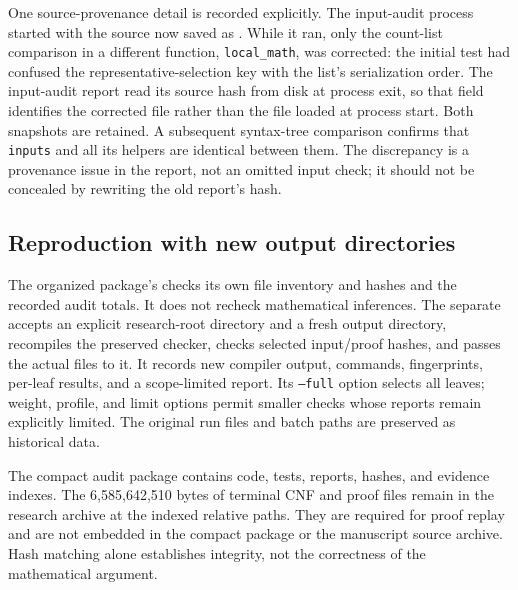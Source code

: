 One source-provenance detail is recorded explicitly. The input-audit
process started with the source now saved as .
While it ran, only the count-list comparison in a different function,
\texttt{local\_math}, was corrected: the initial test had confused the
representative-selection key with the list's serialization order.
The input-audit report read its source hash from disk at process exit,
so that field identifies the corrected file rather than the file loaded
at process start. Both snapshots are retained. A subsequent syntax-tree
comparison confirms that \texttt{inputs} and all its helpers are identical
between them. The discrepancy is a provenance issue in the report, not
an omitted input check; it should not be concealed by rewriting the old
report's hash.

\subsection{Reproduction with new output directories}
The organized package's  checks its own
file inventory and hashes and the recorded audit totals. It does not
recheck mathematical inferences. The separate 
accepts an explicit research-root directory and a fresh output directory,
recompiles the preserved checker, checks selected input/proof hashes,
and passes the actual files to it. It records new compiler output,
commands, fingerprints, per-leaf results, and a scope-limited report.
Its \texttt{--full} option selects all leaves; weight, profile, and limit
options permit smaller checks whose reports remain explicitly limited.
The original run files and batch paths are preserved as historical data.

The compact audit package contains code, tests, reports, hashes, and
evidence indexes. The 6,585,642,510 bytes of terminal CNF and proof files
remain in the research archive at the indexed relative paths. They are
required for proof replay and are not embedded in the compact package
or the manuscript source archive. Hash matching alone establishes
integrity, not the correctness of the mathematical argument.
